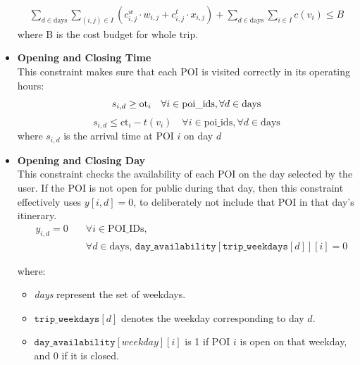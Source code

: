 \begin{itemize}
\begin{align}
\label{mul_day_25}
\sum_{d \in \text{days}} \sum_{(i,j) \in I} \left(c^{w}_{i,j} \cdot w_{i,j} + c^{t}_{i,j} \cdot x_{i,j} \right) + \sum_{d \in \text{days}} \sum_{i \in I} c(v_i) \leq B 
\end{align}
where B is the cost budget for whole trip.
\\[1ex]
\item \textbf{Opening and Closing Time}\\
    This constraint makes sure that each POI is visited correctly in its operating hours:
    \begin{equation}
    \label{mul_day_29}
    s_{i,d} \geq \text{ot}_i \quad \forall i \in \text{{poi\_ids}}, \forall d \in \text{days} \\
    \end{equation}
    \begin{equation}
    \label{mul_day_30}
        s_{i,d} \leq \text{ct}_i - t(v_i) \quad \forall i \in \text{{poi\_ids}}, \forall d \in \text{days}
    \end{equation}
    \noindent
    where \( s_{i,d} \) is the arrival time at POI \( i \) on day \( d \)
\\[1ex]
\item \textbf{Opening and Closing Day}\\
    This constraint checks the availability of each POI on the day selected by the user. If the POI is not open for public during that day, then this constraint effectively uses $y[i, d] = 0$, to deliberately not include that POI in that day's itinerary.
    \begin{align}
    \label{mul_day_31}
 \quad y_{i,d} = 0 \quad  &\forall i \in \text{POI\_IDs}, \nonumber \\
        &\forall d \in \text{days, } \texttt{day\_availability}[\texttt{trip\_weekdays}[d]][i] = 0 \nonumber
\end{align}
  
    \noindent
    where:
    \begin{itemize}
        \item \textit{days} represent the set of weekdays.
        \item \( \texttt{trip\_weekdays}[d] \) denotes the weekday corresponding to day \( d \).
        \item \( \texttt{day\_availability}[weekday][i] \) is 1 if POI \( i \) is open on that weekday, and 0 if it is closed.
    \end{itemize}
\end{itemize}


